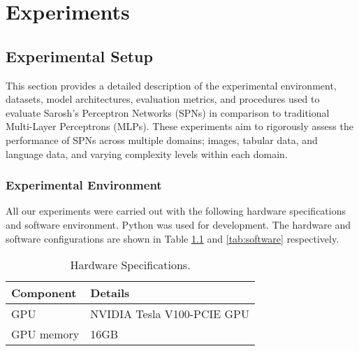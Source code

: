 
\chapter{Experiments} %

\label{Experiments} %


\section{Experimental Setup}

This section provides a detailed description of the experimental environment, datasets, model architectures, evaluation metrics, and procedures used to evaluate Sarosh’s Perceptron Networks (SPNs) in comparison to traditional Multi-Layer Perceptrons (MLPs). These experiments aim to rigorously assess the performance of SPNs across multiple domains; images, tabular data, and language data, and varying complexity levels within each domain.
\subsection{Experimental Environment}
All our experiments were carried out with the following hardware specifications and software environment. Python was used for development. The hardware and software configurations are shown in Table \ref{tab:hardware} and \ref{tab:software} respectively.

\begin{table}[h!]
\centering
\caption{Hardware Specifications.}
\label{tab:hardware}
\begin{tabular}{| m{4cm} | m{6cm} |}
\hline
\textbf{Component} & \textbf{Details} \\
\hline
GPU & NVIDIA Tesla V100-PCIE GPU \\
GPU memory & 16GB \\
\hline
\end{tabular}
\end{table}


